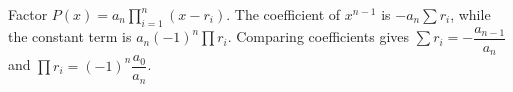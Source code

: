 Factor $P(x)=a_n\prod_{i=1}^n(x-r_i)$. The coefficient of $x^{n-1}$ is $-a_n\sum r_i$, while the constant term is $a_n(-1)^n\prod r_i$. Comparing coefficients gives $\boxed{\sum r_i=-\dfrac{a_{n-1}}{a_n}}$ and $\boxed{\prod r_i=(-1)^n\dfrac{a_0}{a_n}}$.
